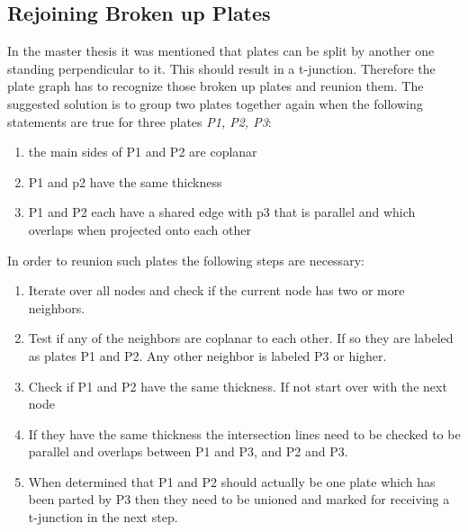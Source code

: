 \documentclass[../ClassicThesis.tex]{subfiles}
\begin{document}
\subsection{Rejoining Broken up Plates}
In the master thesis \cite{master-thesis} it was mentioned that plates can be split by another one standing perpendicular to it. This should result in a t-junction. Therefore the plate graph has to recognize those broken up plates and reunion them. The suggested solution is to group two plates together again when the following statements are true for three plates \emph{P1, P2, P3}:\\
    \begin{enumerate}
        \item the main sides of P1 and P2 are coplanar
        \item P1 and p2 have the same thickness
        \item P1 and P2 each have a shared edge with p3 that is parallel and which overlaps when projected onto each other
    \end{enumerate}
    In order to reunion such plates the following steps are necessary:
    \begin{enumerate}
        \item Iterate over all nodes and check if the current node has two or more neighbors. 
        \item Test if any of the neighbors are coplanar to each other. If so they are labeled as plates P1 and P2. Any other neighbor is labeled P3 or higher.
        \item Check if P1 and P2 have the same thickness. If not start over with the next node
        \item If they have the same thickness the intersection lines need to be checked to be parallel and overlaps between P1 and P3, and P2 and P3.
        \item When determined that P1 and P2 should actually be one plate which has been parted by P3 then they need to be unioned and marked for receiving a t-junction in the next step.
    \end{enumerate}
\end{document}
